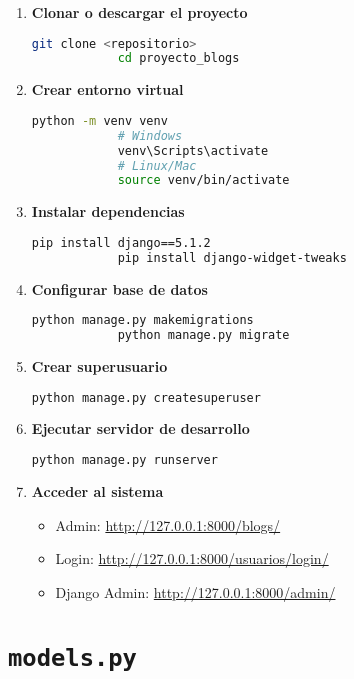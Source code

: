 \documentclass[11pt,a4paper]{report}
\begin{document}
	\begin{enumerate}
		\item \textbf{Clonar o descargar el proyecto}
		\begin{lstlisting}[language=bash]
			git clone <repositorio>
			cd proyecto_blogs
		\end{lstlisting}
		
		\item \textbf{Crear entorno virtual}
		\begin{lstlisting}[language=bash]
			python -m venv venv
			# Windows
			venv\Scripts\activate
			# Linux/Mac
			source venv/bin/activate
		\end{lstlisting}
		
		\item \textbf{Instalar dependencias}
		\begin{lstlisting}[language=bash]
			pip install django==5.1.2
			pip install django-widget-tweaks
		\end{lstlisting}
		
		\item \textbf{Configurar base de datos}
		\begin{lstlisting}[language=bash]
			python manage.py makemigrations
			python manage.py migrate
		\end{lstlisting}
		
		\item \textbf{Crear superusuario}
		\begin{lstlisting}[language=bash]
			python manage.py createsuperuser
		\end{lstlisting}
		
		\item \textbf{Ejecutar servidor de desarrollo}
		\begin{lstlisting}[language=bash]
			python manage.py runserver
		\end{lstlisting}
		
		\item \textbf{Acceder al sistema}
		\begin{itemize}
			\item Admin: \url{http://127.0.0.1:8000/blogs/}
			\item Login: \url{http://127.0.0.1:8000/usuarios/login/}
			\item Django Admin: \url{http://127.0.0.1:8000/admin/}
		\end{itemize}
	\end{enumerate}
	
	\chapter{\texttt{models.py}}
	
\end{document}
